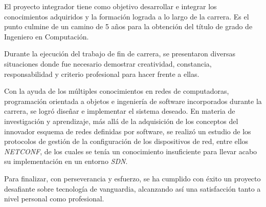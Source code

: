El proyecto integrador tiene como objetivo desarrollar e integrar los conocimientos adquiridos y la formación lograda a lo largo de la carrera. Es el punto culmine de un camino de 5 años para la obtención del título de grado de Ingeniero en Computación.

Durante la ejecución del trabajo de fin de carrera, se presentaron diversas situaciones donde fue necesario demostrar creatividad, constancia, responsabilidad y criterio profesional para hacer frente a ellas.   

Con la ayuda de los múltiples conocimientos en redes de computadoras, programación orientada a objetos e ingeniería de software incorporados durante la carrera, se logró diseñar e implementar el sistema deseado. En materia de investigación y aprendizaje, más allá de la adquisición de los conceptos del innovador esquema de redes definidas por software, se realizó un estudio de los protocolos de gestión de la configuración de los dispositivos de red, entre ellos \textit{NETCONF}, de los cuales se tenía un conocimiento insuficiente para llevar acabo su implementación en un entorno \textit{SDN}.

Para finalizar, con perseverancia y esfuerzo, se ha cumplido con éxito un proyecto desafiante sobre tecnología de vanguardia, alcanzando así una satisfacción tanto a nivel personal como profesional. 